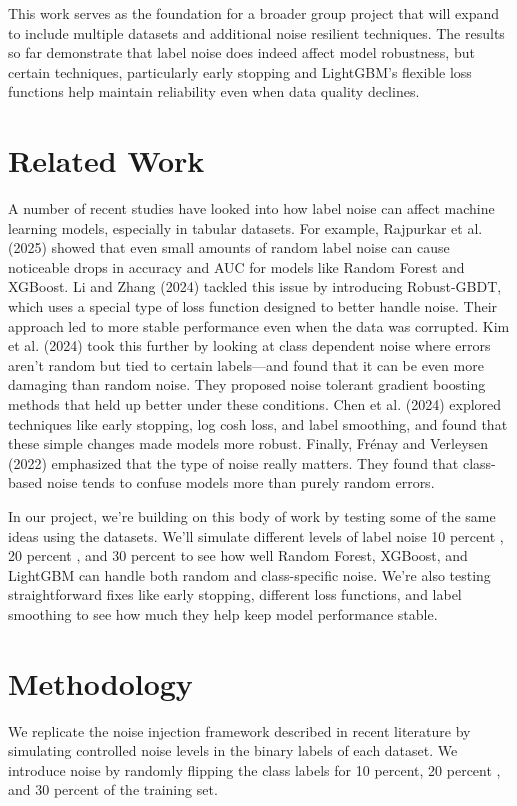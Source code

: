 \documentclass[conference]{IEEEtran}
\begin{document}
This work serves as the foundation for a broader group project that will expand to include multiple datasets and additional noise resilient techniques. The results so far demonstrate that label noise does indeed affect model robustness, but certain techniques, particularly early stopping and LightGBM's flexible loss functions help maintain reliability even when data quality declines.

\section{Related Work}
A number of recent studies have looked into how label noise can affect machine learning models, especially in tabular datasets. For example, Rajpurkar et al. (2025) showed that even small amounts of random label noise can cause noticeable drops in accuracy and AUC for models like Random Forest and XGBoost. Li and Zhang (2024) tackled this issue by introducing Robust-GBDT, which uses a special type of loss function designed to better handle noise. Their approach led to more stable performance even when the data was corrupted. Kim et al. (2024) took this further by looking at class dependent noise where errors aren’t random but tied to certain labels—and found that it can be even more damaging than random noise. They proposed noise tolerant gradient boosting methods that held up better under these conditions. Chen et al. (2024) explored techniques like early stopping, log cosh loss, and label smoothing, and found that these simple changes made models more robust. Finally, Frénay and Verleysen (2022) emphasized that the type of noise really matters. They found that class-based noise tends to confuse models more than purely random errors.

In our project, we’re building on this body of work by testing some of the same ideas using the datasets. We’ll simulate different levels of label noise 10 percent , 20 percent , and 30 percent to see how well Random Forest, XGBoost, and LightGBM can handle both random and class-specific noise. We’re also testing straightforward fixes like early stopping, different loss functions, and label smoothing to see how much they help keep model performance stable.

\section{Methodology}
We replicate the noise injection framework described in recent literature by simulating controlled noise levels in the binary labels of each dataset. We introduce noise by randomly flipping the class labels for 10 percent, 20 percent , and 30 percent of the training set.
\end{document}
